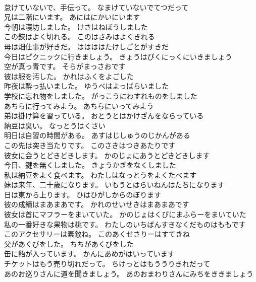 \documentclass[8pt]{extreport}
\begin{document}
\begin{CJK}{UTF8}{min}
\\	怠けていないで、手伝って。	なまけていないでてつだって 
\\	兄は二階にいます。	あにはにかいにいます 
\\	今朝は寝坊しました。	けさはねぼうしました 
\\	この鋏はよく切れる。	このはさみはよくきれる 
\\	母は畑仕事が好きだ。	ははははたけしごとがすきだ 
\\	今日はピクニックに行きましょう。	きょうはぴくにっくにいきましょう 
\\	空が真っ青です。	そらがまっさおです 
\\	彼は服を汚した。	かれはふくをよごした 
\\	昨夜は酔っ払いました。	ゆうべはよっぱらいました 
\\	学校に忘れ物をしました。	がっこうにわすれものをしました 
\\	あちらに行ってみよう。	あちらにいってみよう 
\\	弟は掛け算を習っている。	おとうとはかけざんをならっている 
\\	納豆は臭い。	なっとうはくさい 
\\	明日は自習の時間がある。	あすはじしゅうのじかんがある 
\\	この先は突き当たりです。	このさきはつきあたりです 
\\	彼女に会うとどきどきします。	かのじょにあうとどきどきします 
\\	今日、鍵を無くしました。	きょうかぎをなくしました 
\\	私は納豆をよく食べます。	わたしはなっとうをよくたべます 
\\	妹は来年、二十歳になります。	いもうとはらいねんはたちになります 
\\	日は東から上ります。	ひはひがしからのぼります 
\\	彼の成績はまあまあです。	かれのせいせきはまあまあです 
\\	彼女は首にマフラーをまいていた。	かのじょはくびにまふらーをまいていた 
\\	私の一番好きな果物は桃です。	わたしのいちばんすきなくだものはももです 
\\	このアクセサリーは素敵ね。	このあくせさりーはすてきね 
\\	父があくびをした。	ちちがあくびをした 
\\	缶に飴が入っています。	かんにあめがはいっています 
\\	チケットはもう売り切れだって。	ちけっとはもううりきれだって 
\\	あのお巡りさんに道を聞きましょう。	あのおまわりさんにみちをききましょう 

\end{CJK}
\end{document}
